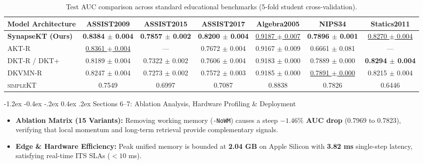 \documentclass[10.5pt,a4paper]{article}
\makeatletter
\renewcommand{\subsection}{\@startsection{subsection}{2}{\z@}%
  {-1.2ex \@plus -0.4ex \@minus -.2ex}%
  {0.4ex \@plus .2ex}%
  {\normalfont\normalsize\bfseries\color{black}}}
\makeatother
\begin{document}
\begin{table}[h]
\centering
\footnotesize
\setlength{\tabcolsep}{5pt}
\begin{tabular}{lcccccc}
\toprule
\textbf{Model Architecture} & \textbf{ASSIST2009} & \textbf{ASSIST2015} & \textbf{ASSIST2017} & \textbf{Algebra2005} & \textbf{NIPS34} & \textbf{Statics2011} \\
\midrule
\textbf{SynapseKT (Ours)} & \textbf{0.8384 $\pm$ 0.004} & \textbf{0.7857 $\pm$ 0.002} & \textbf{0.8200 $\pm$ 0.004} & \underline{0.9187 $\pm$ 0.007} & \textbf{0.7896 $\pm$ 0.001} & \underline{0.8270 $\pm$ 0.004} \\
\textsc{AKT-R} & \underline{0.8361 $\pm$ 0.004} & --- & 0.7672 $\pm$ 0.004 & 0.9167 $\pm$ 0.009 & 0.6661 $\pm$ 0.081 & --- \\
\textsc{DKT-R} / \textsc{DKT+} & 0.8189 $\pm$ 0.004 & 0.7322 $\pm$ 0.002 & 0.7606 $\pm$ 0.004 & 0.9183 $\pm$ 0.000 & 0.7889 $\pm$ 0.000 & \textbf{0.8294 $\pm$ 0.004} \\
\textsc{DKVMN-R} & 0.8247 $\pm$ 0.004 & 0.7273 $\pm$ 0.002 & 0.7572 $\pm$ 0.003 & 0.9185 $\pm$ 0.000 & \underline{0.7891 $\pm$ 0.000} & 0.8215 $\pm$ 0.004 \\
\textsc{simpleKT} & 0.7549 & 0.6997 & 0.7087 & 0.8838 & 0.7826 & 0.6446 \\
\bottomrule
\end{tabular}
\caption{Test AUC comparison across standard educational benchmarks (5-fold student cross-validation).}
\label{tab:summary_perf}
\end{table}

\subsection{Sections 6--7: Ablation Analysis, Hardware Profiling \& Deployment}
\begin{itemize}\setlength{\itemsep}{1.5pt}\setlength{\parskip}{0pt}\setlength{\topsep}{0pt}\setlength{\partopsep}{0pt}
    \item \textbf{Ablation Matrix (15 Variants):} Removing working memory (\texttt{-NoWM}) causes a steep \textbf{$-1.46\%$ AUC drop} (0.7969 to 0.7823), verifying that local momentum and long-term retrieval provide complementary signals.
    \item \textbf{Edge \& Hardware Efficiency:} Peak unified memory is bounded at \textbf{2.04 GB} on Apple Silicon with \textbf{3.82 ms} single-step latency, satisfying real-time ITS SLAs ($<10$ ms).
\end{itemize}
\end{document}
